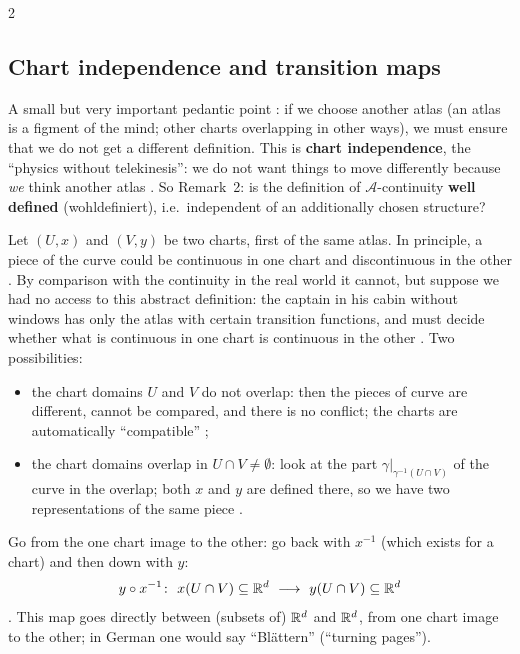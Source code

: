 \begin{paracol}{2}
\subsection{Chart independence and transition maps}\label{ssec:dm-transition}

A small but very important pedantic point : if we choose another atlas (an atlas is a figment of the mind; other
charts overlapping in other ways), we must ensure that we do not get a different definition. This is
\textbf{chart independence}, the ``physics without telekinesis'': we do not want things to move differently because
\emph{we} think another atlas . So Remark~2: is the definition of
$\mathcal A$-continuity \textbf{well defined} (wohldefiniert), i.e.\ independent of an additionally chosen structure?

Let $(U,x)$ and $(V,y)$ be two charts, first of the same atlas. In principle, a piece of the curve could be continuous in
one chart and discontinuous in the other . By comparison with the continuity in the real
world it cannot, but suppose we had no access to this abstract definition: the captain in his cabin without windows has only
the atlas with certain transition functions, and must decide whether what is continuous in one chart is continuous in the
other . Two possibilities:
\begin{itemize}
  \item the chart domains $U$ and $V$ do not overlap: then the pieces of curve are different, cannot be compared, and there
        is no conflict; the charts are automatically ``compatible'' ;
  \item the chart domains overlap in $U\cap V\ne\emptyset$: look at the part $\gamma|_{\gamma^{-1}(U\cap V)}$ of the curve in
        the overlap; both $x$ and $y$ are defined there, so we have two representations of the same piece
        .
\end{itemize}
Go from the one chart image to the other: go back with $x^{-1}$ (which exists for a chart) and then down with $y$:
\[
  y\circ x^{-1}\colon\ x(U\cap V)\subseteq\mathbb{R}^d\ \longrightarrow\ y(U\cap V)\subseteq\mathbb{R}^d
\]
. This map goes directly between
(subsets of) $\mathbb{R}^d$ and $\mathbb{R}^d$, from one chart image to the other; in German one would say ``Blättern'' (``turning pages'').


\end{paracol}
